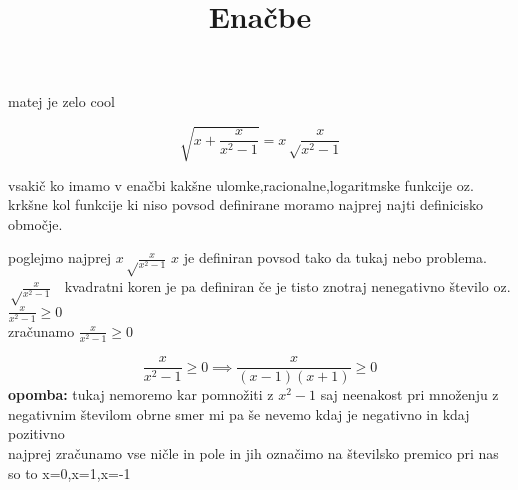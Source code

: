 \documentclass[a4paper]{article}
\begin{document}
matej je zelo cool
\title{Enačbe}
\maketitle
\[
\sqrt{x+\frac{x}{x^{2}-1}}=x\sqrt\frac{x}{x^{2}-1}
\]

vsakič ko imamo v enačbi kakšne ulomke,racionalne,logaritmske funkcije oz. krkšne kol funkcije ki niso povsod definirane moramo najprej najti definicisko območje.

\vspace{1cm}
poglejmo najprej
\(x\sqrt\frac{x}{x^{2}-1}\) $ x$ je definiran povsod tako da tukaj nebo problema.\\
$\sqrt\frac{x}{x^{2}-1}\quad$kvadratni koren je pa definiran če je tisto znotraj nenegativno število oz. $\frac{x}{x^{2}-1}\geq0$\\
zračunamo $\frac{x}{x^{2}-1}\geq0$

\[\frac{x}{x^{2}-1}\geq0\implies\frac{x}{(x-1)(x+1)}\geq0\]
\textbf{opomba: }tukaj nemoremo kar pomnožiti z \(x^{2}-1\) saj neenakost pri množenju z negativnim številom obrne smer mi pa še nevemo kdaj je negativno in kdaj pozitivno\\

najprej zračunamo vse ničle in pole in jih označimo na številsko premico pri nas so to x=0,x=1,x=-1

\begin{center}
\end{center}
\end{document}
